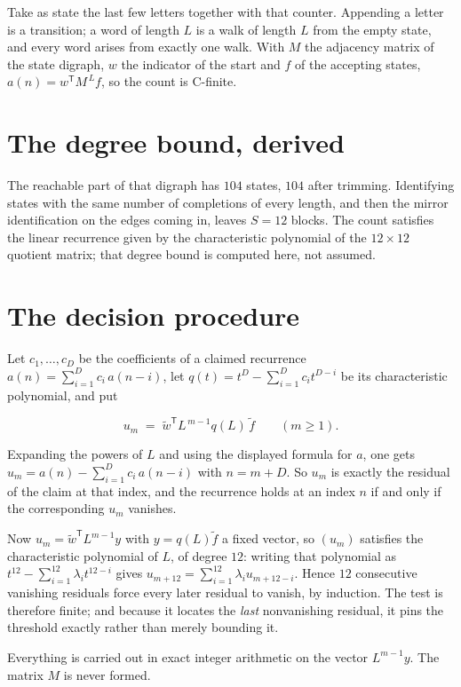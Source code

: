 \documentclass[11pt]{article}
\theoremstyle{definition}
\begin{document}
Take as state the last few letters together with that counter. Appending a letter is a transition; a word of length $L$ is a walk of length $L$ from the empty state, and every word arises from exactly one walk. With $M$ the adjacency matrix of the state digraph, $w$ the indicator of the start and $f$ of the accepting states, $a(n) = w^{\mathsf T}M^{\,L}f$, so the count is C-finite.

\section{The degree bound, derived}

The reachable part of that digraph has $104$ states, $104$ after trimming. Identifying states with the same number of completions of every length, and then the mirror identification on the edges coming in, leaves $S = 12$ blocks. The count satisfies the linear recurrence given by the characteristic polynomial of the $12\times12$ quotient matrix; that degree bound is computed here, not assumed.

\section{The decision procedure}

Let $c_1,\dots,c_D$ be the coefficients of a claimed recurrence $a(n) = \sum_{i=1}^{D} c_i\,a(n-i)$, let $q(t) = t^{D} - \sum_{i=1}^{D} c_i t^{D-i}$ be its characteristic polynomial, and put

\[u_m \;=\; \tilde w^{\mathsf T} L^{\,m-1} q(L)\,\tilde f \qquad (m \ge 1).\]

Expanding the powers of $L$ and using the displayed formula for $a$, one gets $u_m = a(n) - \sum_{i=1}^{D} c_i\,a(n-i)$ with $n = m + D$. So $u_m$ is exactly the residual of the claim at that index, and the recurrence holds at an index $n$ if and only if the corresponding $u_m$ vanishes.

Now $u_m = \tilde w^{\mathsf T} L^{m-1} y$ with $y = q(L)\tilde f$ a fixed vector, so $(u_m)$ satisfies the characteristic polynomial of $L$, of degree $12$: writing that polynomial as $t^{12} - \sum_{i=1}^{12} \lambda_i t^{12-i}$ gives $u_{m+12} = \sum_{i=1}^{12} \lambda_i u_{m+12-i}$. Hence $12$ consecutive vanishing residuals force every later residual to vanish, by induction. The test is therefore finite; and because it locates the {\itshape last} nonvanishing residual, it pins the threshold exactly rather than merely bounding it.

Everything is carried out in exact integer arithmetic on the vector $L^{m-1}y$. The matrix $M$ is never formed.
\end{document}
